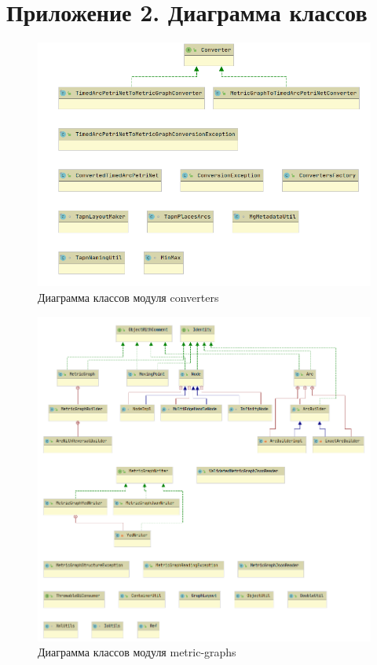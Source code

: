 \documentclass{../TechDoc}
\begin{document}
	\section*{Приложение 2. Диаграмма классов}
	\begin{figure}[h!]
		\centering
		\includegraphics[width=0.9\linewidth]{converters_classes}
		\caption{Диаграмма классов модуля converters}
		\label{fig:convertersclasses}
	\end{figure}
	
	\begin{figure}[h!]
		\centering
		\includegraphics[width=0.9\linewidth]{mg_classes}
		\caption{Диаграмма классов модуля metric-graphs}
		\label{fig:mgclasses}
	\end{figure}
	
\end{document}
